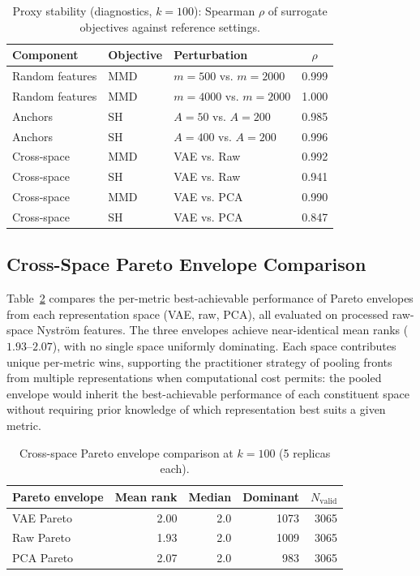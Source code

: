 \documentclass[10pt,journal]{IEEEtran}
\newcommand{\1}{\mathbf{1}}
\theoremstyle{ieeethm}
\begin{document}
\begin{table}[h]
\centering
\caption{Proxy stability (diagnostics, $k=100$): Spearman $\rho$ of surrogate objectives against reference settings.}
\label{tab:proxy-stability}
\small
\begin{tabular}{l l l c}
\toprule
Component & Objective & Perturbation & $\rho$ \\
\midrule
Random features & MMD & $m{=}500$ vs. $m{=}2000$ & 0.999 \\
Random features & MMD & $m{=}4000$ vs. $m{=}2000$ & 1.000 \\
Anchors & SH & $A{=}50$ vs. $A{=}200$ & 0.985 \\
Anchors & SH & $A{=}400$ vs. $A{=}200$ & 0.996 \\
Cross-space & MMD & VAE vs. Raw & 0.992 \\
Cross-space & SH & VAE vs. Raw & 0.941 \\
Cross-space & MMD & VAE vs. PCA & 0.990 \\
Cross-space & SH & VAE vs. PCA & 0.847 \\
\bottomrule
\end{tabular}
\end{table}

\subsection{Cross-Space Pareto Envelope Comparison}

Table~\ref{tab:cross_space_oracle} compares the per-metric best-achievable performance of Pareto envelopes from each representation space (VAE, raw, PCA), all evaluated on processed raw-space Nyström features. The three envelopes achieve near-identical mean ranks ($1.93$--$2.07$), with no single space uniformly dominating. Each space contributes unique per-metric wins, supporting the practitioner strategy of pooling fronts from multiple representations when computational cost permits: the pooled envelope would inherit the best-achievable performance of each constituent space without requiring prior knowledge of which representation best suits a given metric.

\begin{table}[h]
\centering
\caption{Cross-space Pareto envelope comparison at $k=100$ (5 replicas each).}
\label{tab:cross_space_oracle}
\small
\begin{tabular}{@{}l r r r r@{}}
\toprule
Pareto envelope & Mean rank & Median & Dominant & $N_{\mathrm{valid}}$ \\
\midrule
VAE Pareto  & 2.00 & 2.0 & 1073  & 3065 \\
Raw Pareto  & 1.93 & 2.0 & 1009  & 3065 \\
PCA Pareto  & 2.07 & 2.0 & 983  & 3065 \\
\bottomrule
\end{tabular}
\end{table}



\end{document}

